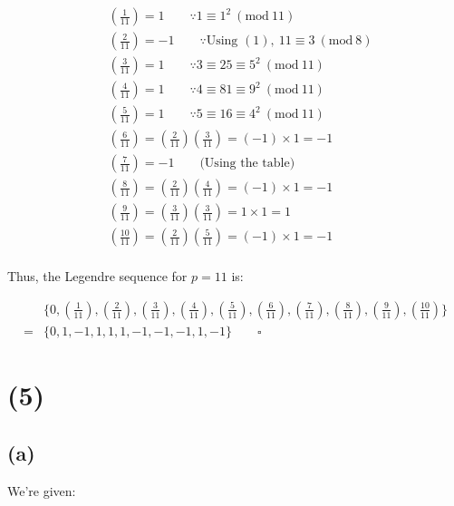 \documentclass{article}
\newcommand{\modwos}[1]{\ (\mathrm{mod}\ #1)}
\begin{document}
\begin{align*}
    & \left(\frac{1}{11}\right) = 1 \qquad \because 1 \equiv 1^2 \modwos{11} \\
    & \left(\frac{2}{11}\right) = -1 \qquad \because \text{Using }(1), \ 11 \equiv 3 \modwos{8} \\ 
    & \left(\frac{3}{11}\right) = 1 \qquad \because 3 \equiv 25 \equiv 5^2 \modwos{11} \\
    & \left(\frac{4}{11}\right) = 1 \qquad \because 4 \equiv 81 \equiv 9^2 \modwos{11} \\
    & \left(\frac{5}{11}\right) = 1 \qquad \because 5 \equiv 16 \equiv 4^2 \modwos{11} \\
    & \left(\frac{6}{11}\right) = \left(\frac{2}{11}\right) \left(\frac{3}{11}\right) = (-1) \times 1 = -1 \\
    & \left(\frac{7}{11}\right) = -1 \qquad \text{(Using the table)} \\
    & \left(\frac{8}{11}\right) = \left(\frac{2}{11}\right) \left(\frac{4}{11}\right) = (-1) \times 1 = -1 \\
    & \left(\frac{9}{11}\right) = \left(\frac{3}{11}\right) \left(\frac{3}{11}\right) = 1 \times 1 = 1 \\
    & \left(\frac{10}{11}\right) = \left(\frac{2}{11}\right) \left(\frac{5}{11}\right) = (-1) \times 1 = -1 \\
\end{align*}


Thus, the Legendre sequence for $p = 11$ is:

\begin{align*}
    &\{0, \left(\frac{1}{11}\right), \left(\frac{2}{11}\right), \left(\frac{3}{11}\right), \left(\frac{4}{11}\right), \left(\frac{5}{11}\right), \left(\frac{6}{11}\right), \left(\frac{7}{11}\right), \left(\frac{8}{11}\right), \left(\frac{9}{11}\right), \left(\frac{10}{11}\right)\} \\
    =& \{0, 1, -1, 1, 1, 1, -1, -1, -1, 1, -1\} \qquad \square
\end{align*}

\section*{(5)}

\subsection*{(a)}

We're given:
\end{document}
